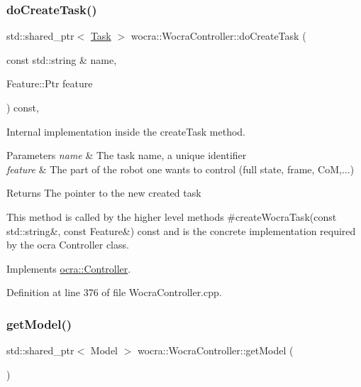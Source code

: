 \subsubsection{\texorpdfstring{do\+Create\+Task()}{doCreateTask()}\hspace{0.1cm}{\footnotesize\ttfamily [2/2]}}
{\footnotesize\ttfamily std\+::shared\+\_\+ptr$<$ \hyperlink{classocra_1_1Task}{Task} $>$ wocra\+::\+Wocra\+Controller\+::do\+Create\+Task (\begin{DoxyParamCaption}\item[{const std\+::string \&}]{name,  }\item[{Feature\+::\+Ptr}]{feature }\end{DoxyParamCaption}) const\hspace{0.3cm}{\ttfamily [protected]}, {\ttfamily [virtual]}}

Internal implementation inside the create\+Task method.


\begin{DoxyParams}{Parameters}
{\em name} & The task name, a unique identifier \\
\hline
{\em feature} & The part of the robot one wants to control (full state, frame, CoM,...) \\
\hline
\end{DoxyParams}
\begin{DoxyReturn}{Returns}
The pointer to the new created task
\end{DoxyReturn}
This method is called by the higher level methods \#create\+Wocra\+Task(const std\+::string\&, const Feature\&) const and is the concrete implementation required by the ocra Controller class. 

Implements \hyperlink{classocra_1_1Controller_a358a31c0b6b6bdcc0e6da5c49eb9fde5}{ocra\+::\+Controller}.



Definition at line 376 of file Wocra\+Controller.\+cpp.

\hypertarget{classwocra_1_1WocraController_adc7f78b5f888c76a3296cfd5882caad1}{}\label{classwocra_1_1WocraController_adc7f78b5f888c76a3296cfd5882caad1} 
\subsubsection{\texorpdfstring{get\+Model()}{getModel()}}
{\footnotesize\ttfamily std\+::shared\+\_\+ptr$<$ Model $>$ wocra\+::\+Wocra\+Controller\+::get\+Model (\begin{DoxyParamCaption}{ }\end{DoxyParamCaption})}

